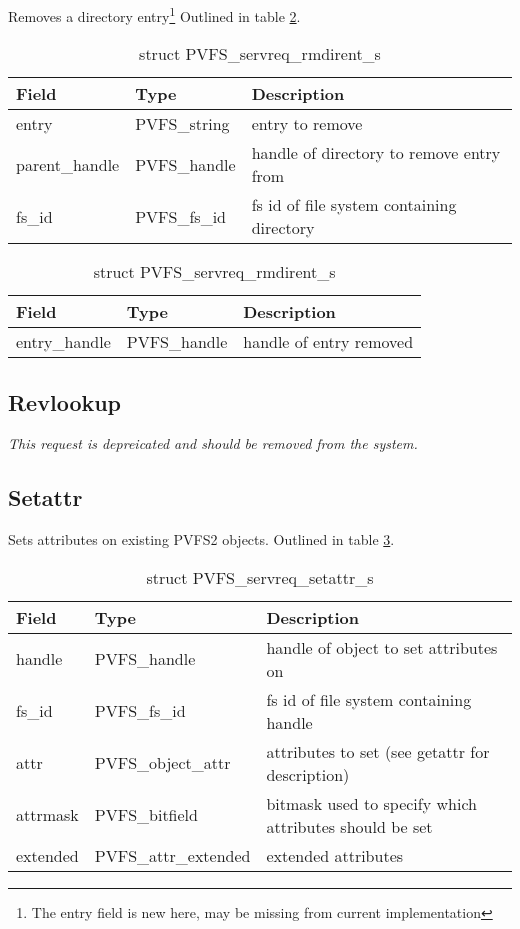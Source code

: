 \documentclass[11pt, letterpaper]{article} %
\begin{document}
Removes a directory entry\footnote{The entry field is new here,
may be missing from current implementation} Outlined in table
\ref{tab:reqrmdirent}.

\begin{table}[H]
\begin{tabular}{|l|l|l|}
\hline
Field & Type & Description \\
\hline
\hline
entry & PVFS\_string & entry to remove\\
\hline
parent\_handle & PVFS\_handle & handle of directory to remove entry from\\
\hline
fs\_id & PVFS\_fs\_id & fs id of file system containing directory\\
\hline
\end{tabular}
\caption{struct PVFS\_servreq\_rmdirent\_s \label{tab:reqrmdirent}}
\end{table}

\begin{table}[H]
\begin{tabular}{|l|l|l|}
\hline
Field & Type & Description \\
\hline
\hline
entry\_handle & PVFS\_handle & handle of entry removed\\
\hline
\end{tabular}
\caption{struct PVFS\_servreq\_rmdirent\_s \label{tab:reqrmdirent}}
\end{table}

\subsection{Revlookup}

\emph{This request is depreicated and should be removed from the
system.}

\subsection{Setattr}

Sets attributes on existing PVFS2 objects.  Outlined in table
\ref{tab:reqsetattr}.

\begin{table}[H]
\begin{tabular}{|l|l|l|}
\hline
Field & Type & Description \\
\hline
\hline
handle & PVFS\_handle & handle of object to set attributes on\\
\hline
fs\_id & PVFS\_fs\_id & fs id of file system containing handle\\
\hline 
attr & PVFS\_object\_attr & attributes to set (see getattr for
description)\\
\hline
attrmask & PVFS\_bitfield & bitmask used to specify which attributes
should be set\\
\hline
extended & PVFS\_attr\_extended & extended attributes\\
\hline
\end{tabular}
\caption{struct PVFS\_servreq\_setattr\_s \label{tab:reqsetattr}}
\end{table}
\end{document}
